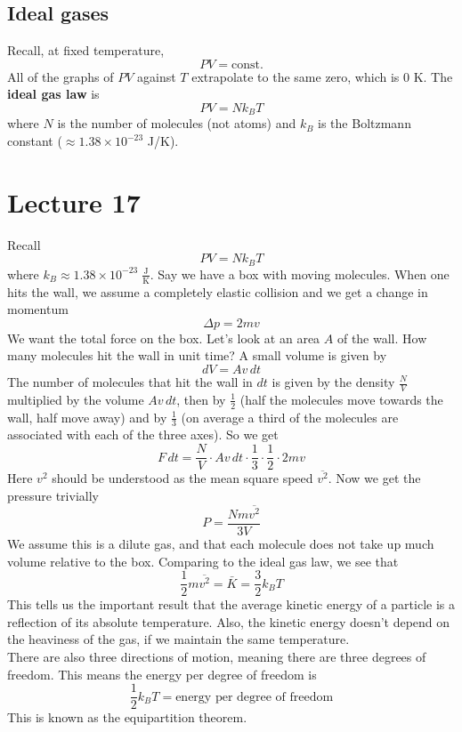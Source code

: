 \documentclass{report}
\numberwithin{equation}{section}
\begin{document}
\subsection{Ideal gases}
Recall, at fixed temperature,
\begin{equation}
    PV = \text{const.}
\end{equation}
All of the graphs of $PV$ against $T$ extrapolate to the same zero, which is $0$ K. The \textbf{ideal gas law} is
\begin{equation}
    PV = Nk_BT
\end{equation}
where $N$ is the number of molecules (not atoms) and $k_B$ is the Boltzmann constant ($\approx 1.38\times 10^{-23}$ J/K).
\section{Lecture 17}
Recall
\begin{equation*}
    PV = Nk_BT
\end{equation*}
where $k_B \approx 1.38\times10^{-23}\;\frac{\text{J}}{\text{K}}$. Say we have a box with moving molecules. When one hits the wall, we assume a completely elastic collision and we get a change in momentum
\begin{equation*}
    \Delta p = 2mv
\end{equation*}
We want the total force on the box. Let's look at an area $A$ of the wall. How many molecules hit the wall
in unit time? A small volume is given by
\begin{equation*}
    dV = A v\, dt
\end{equation*}
The number of molecules that hit the wall in $dt$ is given by the density $\frac{N}{V}$ multiplied by the volume $A v\, dt$, then by $\frac{1}{2}$ (half the molecules move towards the wall, half move away) and by $\frac{1}{3}$ (on average a third of the molecules are associated with each of the three axes). So we get
\begin{equation*}
    F\, dt = \frac{N}{V}\cdot A v\, dt \cdot \frac{1}{3}\cdot\frac{1}{2}\cdot 2mv
\end{equation*}
Here $v^2$ should be understood as the mean square speed $\overline{v^2}$. Now we get the pressure trivially
\begin{equation}
    P = \frac{Nm\overline{v^2}}{3V}
\end{equation}
We assume this is a dilute gas, and that each molecule does not take up much volume relative to the box. Comparing to the ideal gas law, we see that
\begin{equation}
    \frac{1}{2}m\overline{v^2} = \bar{K} = \frac{3}{2}k_BT
\end{equation}
This tells us the important result that the average kinetic energy of a particle is a reflection of its absolute temperature. Also, the kinetic energy doesn't depend on the heaviness of the gas, if we maintain the same temperature.
\\
\noindent There are also three directions of motion, meaning there are three degrees of freedom. This means the energy per degree of freedom is
\begin{equation}
    \frac{1}{2}k_BT = \text{energy per degree of freedom}
\end{equation}
This is known as the equipartition theorem.
\end{document}
